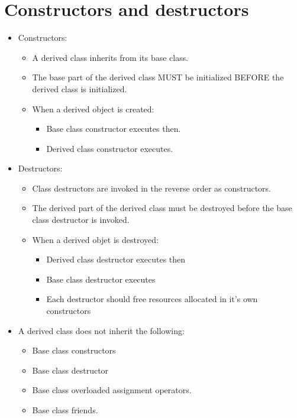 \section{Constructors and destructors}
\begin{itemize}
    \item Constructors:
    \begin{itemize}
            \item A derived class inherits from its base class.
            \item The base part of the derived class MUST be initialized BEFORE the derived class is initialized.
            \item When a derived object is created:
                \begin{itemize}
                    \item Base class constructor executes then.
                    \item Derived class constructor executes.
                \end{itemize}
        \end{itemize}
    \item Destructors:
        \begin{itemize}
            \item Class destructors are invoked in the reverse order as constructors.
            \item The derived part of the derived class must be destroyed before the base class destructor is invoked.
            \item When a derived objet is destroyed:
                \begin{itemize}
                    \item Derived class destructor executes then
                    \item Base class destructor executes
                    \item Each destructor should free resources allocated in it's own constructors
                \end{itemize}
        \end{itemize}
    
    \item A derived class does not inherit the following:
        \begin{itemize}
            \item Base class constructors
            \item Base class destructor
            \item Base class overloaded assignment operators.
            \item Base class friends.
        \end{itemize}
    

\end{itemize}
